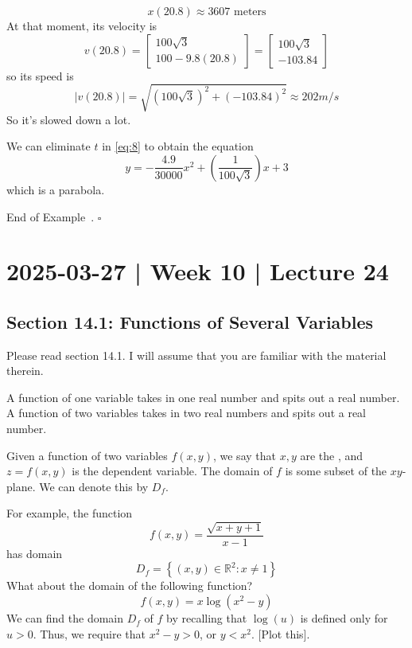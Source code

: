 \documentclass[10pt]{article}
\theoremstyle{definition}
\newtheorem{example}[theorem]{Example}
\renewenvironment{example}
{\begin{oldexample}}
  {\par\smallskip\hfill   End of Example~\theexample. $\square$    \par\end{oldexample}}
\newcommand{\1}[1]{\textbf{1}_{\left[#1\right]}} %
\def\R{\mathbb{R}} %
\newcommand{\dempfcolor}[1]{{\color{RoyalBlue}#1}}
\newcommand{\demph}[1]{\dempfcolor{{\sl #1}}}
\begin{document}
\begin{example}
\begin{equation*}
    x(20.8) \approx 3607 \text{ meters}
  \end{equation*}
  At that moment, its velocity is
  \begin{equation*}
    v(20.8) =
    \begin{bmatrix}
      100 \sqrt{3}\\100-9.8(20.8)
    \end{bmatrix}
    =
    \begin{bmatrix}
      100 \sqrt{3}\\ -103.84
    \end{bmatrix}
  \end{equation*}
  so its speed is
  \begin{equation*}
    |v(20.8)| = \sqrt{(100 \sqrt{3})^{2}+ (-103.84)^{2}} \approx 202 m/s
  \end{equation*}
  So it's slowed down a lot.

  
  We can eliminate $t$  in \cref{eq:8} to obtain the equation
  \begin{equation*}
    y = -\frac{4.9}{30000}x^{2} + \left( \frac{1}{100 \sqrt{3}} \right)x +3 
  \end{equation*}
  which is a parabola.
\end{example}
\newpage

\section{2025-03-27 | Week 10 | Lecture 24}

\subsection{Section 14.1: Functions of Several Variables}

Please read section 14.1. I will assume that you are familiar with the
material therein.

A function of one variable takes in one real number and spits out a real
number. A function of two variables takes in two real numbers and spits out a
real number.


Given a function of two variables $f(x,y)$, we say that $x,y$ are the
\demph{independent variables}, and $z=f(x,y)$ is the dependent variable. The
domain of $f$ is some subset of the $xy$-plane. We can denote this by $D_{f}$.

For example, the function
\begin{equation*}
  f(x,y) = \frac{\sqrt{x+y+1}}{x-1}
\end{equation*}
has domain 
\begin{equation*}
  D_{f} = \left\{(x,y)\in \R^{2}: x\neq 1\right\}
\end{equation*}
What about the domain of the following function?
\begin{equation*}
  f(x,y)= x \log \left( x^{2}-y \right) 
\end{equation*}
We can find the domain $D_{f}$ of $f$ by recalling that $\log(u)$ is defined only for $u>0$. Thus, we
require that $x^{2}-y>0$, or $y<x^{2}$. [Plot this].
\end{document}
